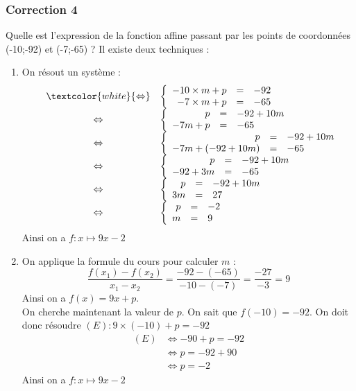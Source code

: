 \documentclass[15pt, mathserif]{beamer}
\begin{document}
\begin{frame}
\vspace{-10mm}
	\frametitle{Correction 4}
\vspace*{1cm} 
 \footnotesize{Quelle est l'expression de la fonction affine passant par les points de coordonnées (-10;-92) et (-7;-65) ? Il existe deux techniques :} 
 \begin{multicols}{2} 
 \begin{enumerate} 
 \item On résout un système : $$ \begin{array}{rcl} 
 & \textcolor{white}{\Leftrightarrow} & 
 \left 
 \{\begin{array}{rcl}-10\times m + p&=&-92 \\ 
 -7\times m+p&=&-65\end{array} \right. \\ 
 &\Leftrightarrow & \left 
 \{\begin{array}{rcl} p&=&-92+10m \\ 
 -7m+p&=&-65\end{array} \right. \\ 
 &\Leftrightarrow & \left 
 \{\begin{array}{rcl} p&=&-92+10m \\ 
 -7m+(-92+10m) &=&-65\end{array} \right. \\ &\Leftrightarrow& \left \{\begin{array}{rcl}p&=&-92+10m \\ 
 -92+3m&=&-65\end{array} \right. \\ &\Leftrightarrow& \left \{\begin{array}{rcl}p&=&-92+10m \\ 
 3m&=&27\end{array} \right. \\  &\Leftrightarrow& \left \{\begin{array}{rcl} p&=&-2 \\  m&=&9\end{array}\right. \end{array}$$ 
 Ainsi on a $f:x\mapsto 9x-2$ 
 \columnbreak 
 \item 
 \footnotesize{On applique la formule du cours pour calculer $m$ :$$ \dfrac{f(x_1)-f(x_2)}{x_1-x_2}=\dfrac{-92-\left(-65\right)}{-10-\left(-7\right)}= \dfrac{-27}{-3}=9$$} \footnotesize{ Ainsi on a $f(x)= 9x +p $. 
  \\ On cherche maintenant la valeur de $p$. On sait que $f(-10)=-92$. On doit donc résoudre $(E): 9\times\left(-10\right)+p=-92$}	 
 \begin{align*} (E)& \Leftrightarrow -90+p=-92\\
		 	 & \Leftrightarrow p=-92+90\\
			 & \Leftrightarrow p=-2
	 \end{align*} 
 Ainsi on a $f:x\mapsto 9x-2$ 
 \end{enumerate} 
 \end{multicols} 
 \end{frame}
\end{document}
